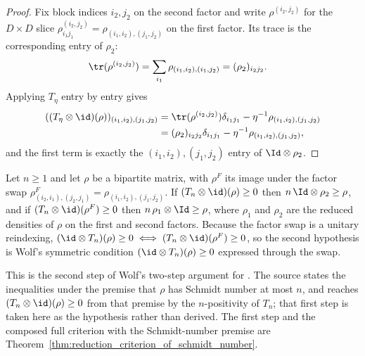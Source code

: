 \begin{proof}
    \leanok
    Fix block indices $i_2,j_2$ on the second factor and write $\rho^{(i_2,j_2)}$
    for the $D\times D$ slice $\rho^{(i_2,j_2)}_{i_1 j_1}=\rho_{(i_1,i_2),(j_1,j_2)}$
    on the first factor. Its trace is the corresponding entry of $\rho_2$:
    \begin{align}
        \tr(\rho^{(i_2,j_2)})
         & =\sum_{i_1}\rho_{(i_1,i_2),(i_1,j_2)}
        =(\rho_2)_{i_2 j_2}.
        \notag
    \end{align}
    Applying $T_\eta$ entry by entry gives
    \begin{align}
        ((T_\eta\otimes\id)(\rho))_{(i_1,i_2),(j_1,j_2)}
         & =\tr(\rho^{(i_2,j_2)}) \delta_{i_1 j_1}
        -\eta^{-1}\rho_{(i_1,i_2),(j_1,j_2)}
        \notag                                     \\
         & =(\rho_2)_{i_2 j_2} \delta_{i_1 j_1}
        -\eta^{-1}\rho_{(i_1,i_2),(j_1,j_2)},
        \notag
    \end{align}
    and the first term is exactly the $(i_1,i_2),(j_1,j_2)$ entry of
    $\Id\otimes\rho_2$.
\end{proof}

\begin{theorem}
    \label{thm:reduction_criterion}
    \leanok
    Let $n\ge 1$ and let $\rho$ be a bipartite matrix, with $\rho^{F}$ its image
    under the factor swap $\rho^{F}_{(i_2,i_1),(j_2,j_1)}=\rho_{(i_1,i_2),(j_1,j_2)}$.
    If $(T_n\otimes\id)(\rho)\ge0$ then
    $n\,\Id\otimes\rho_2\ge\rho$, and if
    $(T_n\otimes\id)(\rho^{F})\ge0$ then
    $n\,\rho_1\otimes\Id\ge\rho$, where $\rho_1$ and $\rho_2$ are the reduced
    densities of $\rho$ on the first and second factors. Because the factor
    swap is a unitary reindexing,
    $(\id\otimes T_n)(\rho)\ge0
        \iff(T_n\otimes\id)(\rho^{F})\ge0$, so the second hypothesis is Wolf's
    symmetric condition
    $(\id\otimes T_n)(\rho)\ge0$ expressed through the swap.

    This is the second step of Wolf's two-step argument for
    \cite[Equation~(3.18)]{Wolf2012Quantum}. The source states the inequalities
    under the premise that $\rho$ has Schmidt number at most $n$, and reaches
    $(T_n\otimes\id)(\rho)\ge0$ from that premise by the $n$-positivity of
    $T_n$; that first step is taken here as the hypothesis rather than derived.
    The first step and the composed full criterion with the Schmidt-number
    premise are
    Theorem~\ref{thm:reduction_criterion_of_schmidt_number}.
\end{theorem}

